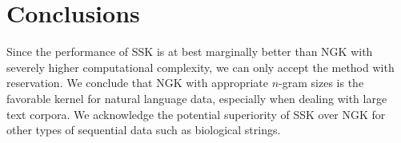 \section{Conclusions} \label{sec:conclusions}

Since the performance of SSK is at best marginally better than NGK with severely higher computational complexity, we can only accept the method with reservation. We conclude that NGK with appropriate $n$-gram sizes is the favorable kernel for natural language data, especially when dealing with large text corpora. We acknowledge the potential superiority of SSK over NGK for other types of sequential data such as biological strings.